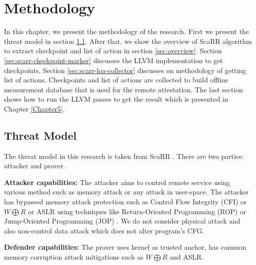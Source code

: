 
\chapter{Methodology} %

\label{Chapter4} %

In this chapter, we present the methodology of the research. First we present
the threat model in section \ref{sec:threat-model}.  After that, we show the
overview of ScaRR algorithm to extract checkpoint and list of action in section
\ref{sec:overview}. Section \ref{sec:scarr-checkpoint-marker} discusses the LLVM
implementation to get checkpoints. Section \ref{sec:scarr-loa-collector}
discusses on methodology of getting list of actions.  
Checkpoints and list of actions are collected to build offline measurement 
database that is used for the remote attestation. The last section shows how to run the LLVM passes to 
get the result which is presented in Chapter \ref{Chapter5}.

\section{Threat Model}
\label{sec:threat-model}

The threat model in this research is taken from ScaRR
\cite{toffaliniScaRRScalableRuntime2019}. There are two parties: attacker and
prover. 

\vspace{0.5cm}
\noindent \textbf{Attacker capabilities:} The attacker aims to control remote
service using various method such as memory attack or any attack in user-space.
The attacker has bypassed memory attack protection such as Control Flow
Integrity (CFI) or \( W \bigoplus R \) or ASLR using techniques like
Return-Oriented Programming
(ROP)\cite{roemerReturnorientedProgrammingSystems2012} or Jump-Oriented
Programming (JOP) \cite{bletschJumpOrientedProgrammingNew2011}. We do not
consider physical attack and also non-control data attack which does not alter
program's CFG.

\vspace{0.5cm}
\noindent \textbf{Defender capabilities:} The prover uses kernel as trusted
anchor, has common memory corruption attack mitigations such as \( W
\bigoplus R \) and ASLR.

